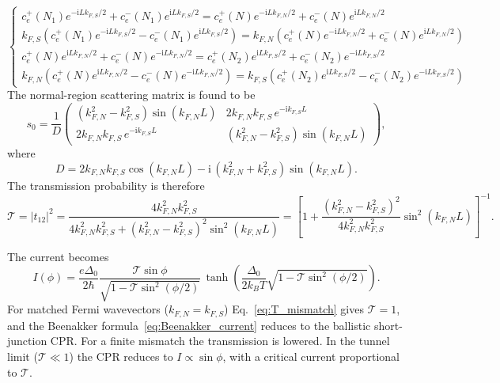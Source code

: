 \documentclass[11pt,a4paper,twoside,openany]{report}
\begin{document}
\[\begin{cases}
    c_e^+(N_1)e^{-\mathrm{i}Lk_{F,S}/2}+c_e^-(N_1)e^{\mathrm{i}Lk_{F,S}/2}=c_e^+(N)e^{-\mathrm{i}Lk_{F,N}/2}+c_e^-(N)e^{\mathrm{i}Lk_{F,N}/2}\\
    k_{F,S}(c_e^+(N_1)e^{-\mathrm{i}Lk_{F,S}/2}-c_e^-(N_1)e^{\mathrm{i}Lk_{F,S}/2})=k_{F,N}(c_e^+(N)e^{-\mathrm{i}Lk_{F,N}/2}+c_e^-(N)e^{\mathrm{i}Lk_{F,N}/2})\\
    c_e^+(N)e^{\mathrm{i}Lk_{F,N}/2}+c_e^-(N)e^{-\mathrm{i}Lk_{F,N}/2}=c_e^+(N_2)e^{\mathrm{i}Lk_{F,S}/2}+c_e^-(N_2)e^{-\mathrm{i}Lk_{F,S}/2} \\
    k_{F,N}(c_e^+(N)e^{\mathrm{i}Lk_{F,N}/2}-c_e^-(N)e^{-\mathrm{i}Lk_{F,N}/2})=k_{F,S}(c_e^+(N_2)e^{\mathrm{i}Lk_{F,S}/2}-c_e^-(N_2)e^{-\mathrm{i}Lk_{F,S}/2})
\end{cases}\]
The normal-region scattering matrix is found to be
\begin{equation}
  s_0 = \frac{1}{D}
        \begin{pmatrix}
          (k_{F,N}^2 - k_{F,S}^2) \sin(k_{F,N}L) &
          2 k_{F,N} k_{F,S} \, e^{-\mathrm{i} k_{F,S}L} \\[6pt]
          2 k_{F,N} k_{F,S} \, e^{-\mathrm{i} k_{F,S}L} &
          (k_{F,N}^2 - k_{F,S}^2) \sin(k_{F,N}L)
        \end{pmatrix},
  \label{eq:s0_mismatch}
\end{equation}
where
\begin{equation}
  D = 2 k_{F,N} k_{F,S} \cos(k_{F,N}L) - \mathrm{i}\,(k_{F,N}^2 + k_{F,S}^2) \sin(k_{F,N}L).
\end{equation}
The transmission probability is therefore
\begin{equation}
  \boxed{
  \mathcal{T} = |t_{12}|^2 = \frac{4k_{F,N}^2 k_{F,S}^2}
                        {4k_{F,N}^2 k_{F,S}^2
                         + (k_{F,N}^2 - k_{F,S}^2)^2 \sin^2(k_{F,N} L)}
    = \left[ 1 + \frac{(k_{F,N}^2 - k_{F,S}^2)^2}{4k_{F,N}^2 k_{F,S}^2}
                 \sin^2(k_{F,N} L) \right]^{-1} .
  }
  \label{eq:T_mismatch}
\end{equation}

The current becomes
\begin{equation}
\boxed{
I(\phi) = \frac{e\Delta_0}{2\hbar} \frac{\mathcal{T} \sin\phi}{\sqrt{1 - \mathcal{T} \sin^2(\phi/2)}} \,
\tanh\!\left( \frac{\Delta_0}{2k_B T} \sqrt{1 - \mathcal{T} \sin^2(\phi/2)} \right). 
}\label{eq:Beenakker_current}
\end{equation}
For matched Fermi wavevectors ($k_{F,N}=k_{F,S}$) Eq.~\eqref{eq:T_mismatch} gives $\mathcal{T}=1$, and the Beenakker formula~\eqref{eq:Beenakker_current} reduces to the ballistic short-junction CPR.  For a finite mismatch the transmission is lowered. In the tunnel limit ($\mathcal{T}\ll 1$) the CPR reduces to \(I \propto \sin\phi\), with a critical current proportional to $\mathcal{T}$.
\end{document}

